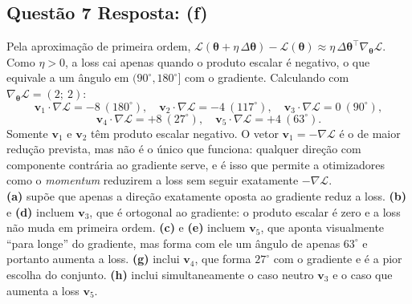 \documentclass[11pt,a4paper]{article}
\begin{document}
\subsection*{Questão 7 \textemdash{} Resposta: (f)}
Pela aproximação de primeira ordem, $\mathcal{L}(\boldsymbol{\theta} + \eta\,\Delta\boldsymbol{\theta}) - \mathcal{L}(\boldsymbol{\theta}) \approx \eta\,\Delta\boldsymbol{\theta}^{\top}\nabla_{\boldsymbol{\theta}}\mathcal{L}$. Como $\eta > 0$, a loss cai apenas quando o produto escalar é negativo, o que equivale a um ângulo em $(90^\circ, 180^\circ]$ com o gradiente. Calculando com $\nabla_{\boldsymbol{\theta}}\mathcal{L} = (2;\ 2)$:
\[
\mathbf{v}_1 \cdot \nabla\mathcal{L} = -8 \ (180^\circ), \quad
\mathbf{v}_2 \cdot \nabla\mathcal{L} = -4 \ (117^\circ), \quad
\mathbf{v}_3 \cdot \nabla\mathcal{L} = 0 \ (90^\circ),
\]
\[
\mathbf{v}_4 \cdot \nabla\mathcal{L} = +8 \ (27^\circ), \quad
\mathbf{v}_5 \cdot \nabla\mathcal{L} = +4 \ (63^\circ).
\]
Somente $\mathbf{v}_1$ e $\mathbf{v}_2$ têm produto escalar negativo. O vetor $\mathbf{v}_1 = -\nabla\mathcal{L}$ é o de maior redução prevista, mas não é o único que funciona: qualquer direção com componente contrária ao gradiente serve, e é isso que permite a otimizadores como o \textit{momentum} reduzirem a loss sem seguir exatamente $-\nabla\mathcal{L}$.\\
\textbf{(a)} supõe que apenas a direção exatamente oposta ao gradiente reduz a loss.
\textbf{(b)} e \textbf{(d)} incluem $\mathbf{v}_3$, que é ortogonal ao gradiente: o produto escalar é zero e a loss não muda em primeira ordem.
\textbf{(c)} e \textbf{(e)} incluem $\mathbf{v}_5$, que aponta visualmente ``para longe'' do gradiente, mas forma com ele um ângulo de apenas $63^\circ$ e portanto aumenta a loss.
\textbf{(g)} inclui $\mathbf{v}_4$, que forma $27^\circ$ com o gradiente e é a pior escolha do conjunto.
\textbf{(h)} inclui simultaneamente o caso neutro $\mathbf{v}_3$ e o caso que aumenta a loss $\mathbf{v}_5$.
\end{document}
